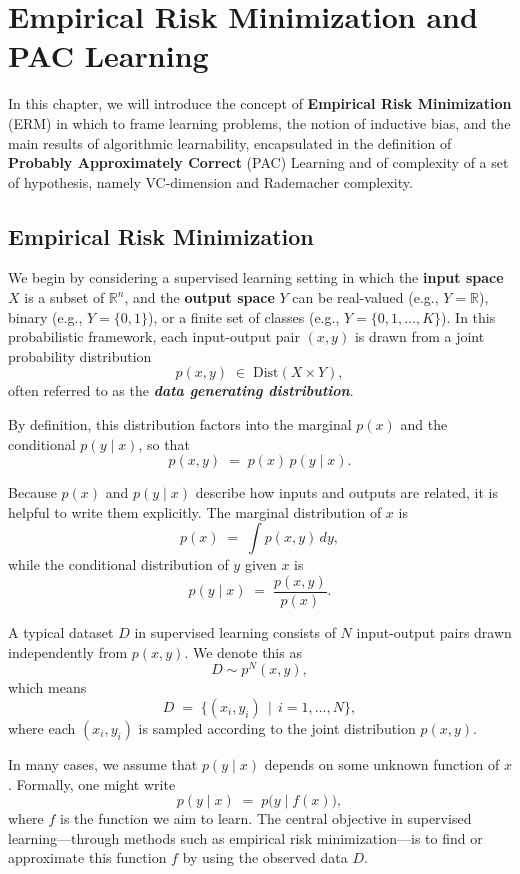\newpage
\chapter{Empirical Risk Minimization and PAC Learning}

In this chapter, we will introduce the concept of \textbf{Empirical Risk Minimization} (ERM) in which to frame learning problems, the notion of inductive bias, and the main results of algorithmic learnability, encapsulated in the definition of \textbf{Probably Approximately Correct} (PAC) Learning and of complexity of a set of hypothesis, namely
VC-dimension and Rademacher complexity.

\section{Empirical Risk Minimization}

We begin by considering a supervised learning setting in which the \textbf{input space} $X$ is a subset of $\mathbb{R}^n$, and the \textbf{output space} $Y$ can be real-valued (e.g., $Y = \mathbb{R}$), binary (e.g., $Y = \{0,1\}$), or a finite set of classes (e.g., $Y = \{0,1,\ldots,K\}$). In this probabilistic framework, each input-output pair $(x,y)$ is drawn from a joint probability distribution
$$
p(x,y) \;\in\; \mathrm{Dist}(X \times Y),
$$
often referred to as the \emph{\textbf{data generating distribution}}. 

By definition, this distribution factors into the marginal $p(x)$ and the conditional $p(y \mid x)$, so that
$$
p(x,y) \;=\; p(x)\,p(y \mid x).
$$

Because $p(x)$ and $p(y \mid x)$ describe how inputs and outputs are related, it is helpful to write them explicitly. The marginal distribution of $x$ is
$$
p(x) \;=\; \int p(x,y)\,dy,
$$
while the conditional distribution of $y$ given $x$ is
$$
p(y \mid x) \;=\; \frac{p(x,y)}{p(x)}.
$$

A typical dataset $D$ in supervised learning consists of $N$ input-output pairs drawn independently from $p(x,y)$. We denote this as
$$
D \sim p^N(x,y),
$$
which means
$$
D \;=\; \{(x_i, y_i) \,\mid\, i = 1, \dots, N\},
$$
where each $(x_i, y_i)$ is sampled according to the joint distribution $p(x,y)$. 

In many cases, we assume that $p(y \mid x)$ depends on some unknown function of $x$. Formally, one might write
$$
p(y \mid x) \;=\; p\bigl(y \mid f(x)\bigr),
$$
where $f$ is the function we aim to learn. The central objective in supervised learning—through methods such as empirical risk minimization—is to find or approximate this function $f$ by using the observed data $D$.

